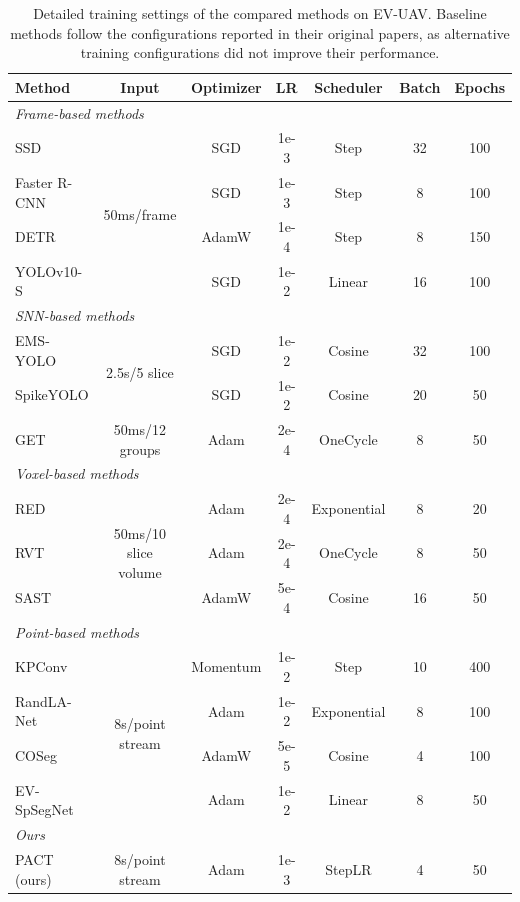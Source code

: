 \documentclass[runningheads]{llncs}
\begin{document}
\begin{table}[t]
\centering
\caption{Detailed training settings of the compared methods on EV-UAV.
Baseline methods follow the configurations reported in their original papers, as alternative training configurations did not improve their performance.}
\label{tab:additional_settings}
\small
\renewcommand{\arraystretch}{1.15}
\setlength{\tabcolsep}{3pt}
\begin{tabular}{lcccccc}
\toprule
Method & Input & Optimizer & LR & Scheduler & Batch & Epochs \\
\midrule

\multicolumn{7}{l}{\textcolor{groupfg}{\textit{Frame-based methods}}} \\
SSD & \multirow{4}{*}{50ms/frame} & SGD & 1e-3 & Step & 32 & 100 \\
Faster R-CNN &   & SGD & 1e-3 & Step & 8  & 100 \\
DETR         &   & AdamW  & 1e-4   & Step & 8  & 150 \\
YOLOv10-S    &      & SGD & 1e-2 & Linear & 16 & 100 \\
\midrule

\multicolumn{7}{l}{\textcolor{groupfg}{\textit{SNN-based methods}}} \\
EMS-YOLO     & \multirow{2}{*}{2.5s/5 slice}  & SGD & 1e-2 & Cosine & 32 & 100 \\
SpikeYOLO    &   & SGD & 1e-2 & Cosine & 20 & 50 \\
GET          & 50ms/12 groups & Adam & 2e-4 & OneCycle & 8 & 50 \\
\midrule

\multicolumn{7}{l}{\textcolor{groupfg}{\textit{Voxel-based methods}}} \\
RED          & \multirow{3}{*}{50ms/10 slice volume} & Adam   & 2e-4 & Exponential & 8 & 20 \\
RVT          &  & Adam   & 2e-4 & OneCycle & 8 & 50 \\
SAST         &   & AdamW & 5e-4 & Cosine & 16 & 50 \\
\midrule

\multicolumn{7}{l}{\textcolor{groupfg}{\textit{Point-based methods}}} \\
KPConv       & \multirow{4}{*}{8s/point stream} & Momentum & 1e-2 & Step & 10 & 400 \\
RandLA-Net   &   & Adam   & 1e-2 & Exponential & 8  & 100 \\
COSeg        &   & AdamW  & 5e-5 & Cosine & 4 & 100 \\
EV-SpSegNet  &   & Adam   & 1e-2 & Linear & 8   & 50 \\
\midrule

\multicolumn{7}{l}{\textcolor{groupfg}{\textit{Ours}}} \\
PACT (ours)  & 8s/point stream & Adam & 1e-3 & StepLR & 4 & 50 \\
\bottomrule
\end{tabular}
\end{table}
\end{document}
